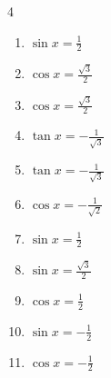 \begin{multicols}{4}
\begin{enumerate}

  \item $\displaystyle \sin{x}  = \frac{1}{2}$


  \item $\displaystyle \cos{x}  = \frac{\sqrt{3}}{2}$


  \item $\displaystyle \cos{x}  = \frac{\sqrt{3}}{2}$


  \item $\displaystyle \tan{x}  = -\frac{1}{\sqrt{3}}$


  \item $\displaystyle \tan{x}  = -\frac{1}{\sqrt{3}}$


  \item $\displaystyle \cos{x}  = -\frac{1}{\sqrt{2}}$


\columnbreak %

\resetques

  \item $\displaystyle \sin{x}  = \frac{1}{2}$


  \item $\displaystyle \sin{x}  = \frac{\sqrt{3}}{2}$


  \item $\displaystyle \cos{x}  = \frac{1}{2}$


  \item $\displaystyle \sin{x}  = -\frac{1}{2}$


  \item $\displaystyle \cos{x}  = -\frac{1}{2}$


\end{enumerate}
\end{multicols}
